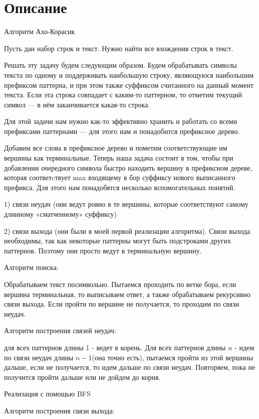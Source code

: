 \section{Описание}

Алгоритм Ахо-Корасик

Пусть дан набор строк и текст. Нужно найти все вхождения строк в текст.

Решать эту задачу будем следующим образом. Будем обрабатывать символы текста по одному и поддерживать наибольшую строку,
являющуюся наибольшим префиксом паттерна, и при этом также суффиксом считанного на данный момент текста. Если эта строка совпадает с каким-то
паттерном, то отметим текущий символ — в нём заканчивается какая-то строка.

Для этой задачи нам нужно как-то эффективно хранить и работать со всеми префиксами паттернами — для этого нам и понадобится префиксное дерево.

Добавим все слова в префиксное дерево и пометим соответствующие им вершины как терминальные.
Теперь наша задача состоит в том, чтобы при добавлении очередного символа быстро находить вершину
в префиксном дереве,
которая соответcтвует
max
входящему в бор суффиксу нового выписанного префикса. Для этого нам понадобятся несколько вспомогательных понятий.

1) связи неудач (они ведут ровно в те вершины, которые соответствуют самому длинному «сматченному» суффиксу)

2) связи выхода (они были в моей первой реализации алгоритма). Связи выхода необходимы, так как некоторые паттерны могут быть подстроками других паттернов.
Поэтому они просто ведут в терминальную вершину.

Алгоритм поиска:

Обрабатываем текст посимвольно. Пытаемся проходить по ветке бора, если вершина терминальная, то выписываем ответ,
а также обрабатываем рекурсивно связи выхода. Если пройти по вершине не получается, то проходим по связи неудач.

Алгоритм построения связей неудач:

для всех паттернов длины 1 - ведет в корень.
Для всех паттернов длины $n$ - идем по связи неудач длины $n - 1$(она точно есть), пытаемся пройти из этой вершины дальше,
если не получается, то идем дальше по связи неудач. Повторяем, пока не получится пройти дальше или не дойдем до корня.

Реализация с помощью BFS

Алгоритм построения связи выхода:

